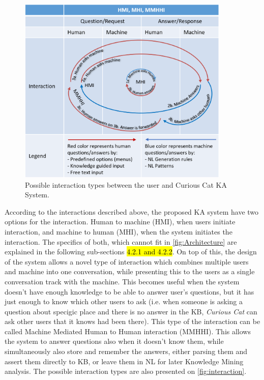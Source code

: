 \begin{figure}[htb]
	\centering
		\includegraphics[width=0.9\textwidth]{figures/interactionLoop.png}
	\caption{Possible interaction types between the user and Curious Cat KA
			 System.}
	\label{fig:interaction}
\end{figure}

According to the interactions described above, the proposed KA system have two 
options for the interaction. Human to machine (HMI), when users initiate 
interaction, and machine to human (MHI), when the system initiates the 
interaction. The specifics of both, which cannot fit in 
\autoref{fig:Architecture} are explained in the following sub-sections 
\hl{4.2.1 and 4.2.2}. On top of this, the design of the system allows a novel 
type of interaction which combines multiple users and machine into one 
conversation, while presenting this to the users as a single conversation track
with the machine. This becomes useful when the system doesn't have enough
knowledge to be able to answer user's questions, but it has just enough to know
which other users to ask (i.e. when someone is asking a question about specigic
place and there is no answer in the KB, \emph{Curious Cat} can ask other users
that it knows had been there). This type of the interaction can be called
Machine Mediated Human to Human interaction (MMHHI). This allows the system
to answer questions also when it doesn't know them, while simultaneously also
store and remember the answers, either parsing them and assert them directly to 
KB, or leave them in NL for later Knowledge Mining analysis. The possible
interaction types are also presented on \autoref{fig:interaction}.

